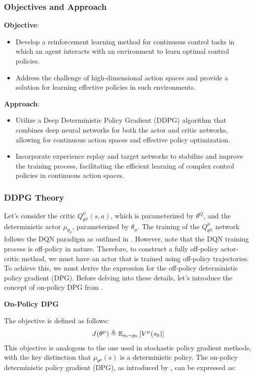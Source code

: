 \documentclass{article}
\begin{document}
\subsubsection{Objectives and Approach}
\textbf{Objective}:
\begin{itemize}
\item Develop a reinforcement learning method for continuous control tasks in which an agent interacts with an environment to learn optimal control policies.
\item Address the challenge of high-dimensional action spaces and provide a solution for learning effective policies in such environments.
\end{itemize}

\noindent \textbf{Approach}:
\begin{itemize}
\item Utilize a Deep Deterministic Policy Gradient (DDPG) algorithm that combines deep neural networks for both the actor and critic networks, allowing for continuous action spaces and effective policy optimization.
\item Incorporate experience replay and target networks to stabilize and improve the training process, facilitating the efficient learning of complex control policies in continuous action spaces.
\end{itemize}
\subsubsection{DDPG Theory}
Let's consider the critic $Q^\mu_{\theta^Q}(s, a)$, which is parameterized by $\theta^Q$, and the deterministic actor $\mu_{\theta_\mu}$, parameterized by $\theta_\mu$. The training of the $Q^\mu_{\theta^Q}$ network follows the DQN paradigm as outlined in \cite{mnih2015human}. However, note that the DQN training process is off-policy in nature. Therefore, to construct a fully off-policy actor-critic method, we must have an actor that is trained using off-policy trajectories. To achieve this, we must derive the expression for the off-policy deterministic policy gradient (DPG). Before delving into these details, let's introduce the concept of on-policy DPG from \cite{silver2014deterministic}.

\vspace{10pt}
\noindent\textbf{On-Policy DPG}

\noindent The objective is defined as follows:
\begin{align}
J(\theta^\mu) \triangleq {\mathbb E}_{s_0\sim p_0} \left[V^\mu(s_0)\right]
\end{align}
This objective is analogous to the one used in stochastic policy gradient methods, with the key distinction that $\mu_{\theta^\mu}(s)$ is a deterministic policy. The on-policy deterministic policy gradient (DPG), as introduced by \cite{silver2014deterministic}, can be expressed as:
\end{document}
